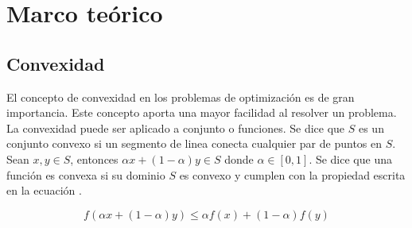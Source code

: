\section{Marco teórico}

\subsection{Convexidad}

El concepto de convexidad en los problemas de optimización es de gran importancia. Este concepto aporta una mayor facilidad al resolver un problema. La convexidad puede ser aplicado a conjunto o funciones. Se dice que $S$ es un conjunto convexo si un segmento de linea conecta cualquier par de puntos en $S$. Sean $x,y \in S$, entonces $\alpha x + (1-\alpha)y \in S$ donde $\alpha \in [0,1]$. Se dice que una función es convexa si su dominio $S$ es convexo y cumplen con la propiedad escrita en la ecuación .

\begin{equation}
    f(\alpha x + (1-\alpha)y) \leq \alpha f(x) + (1-\alpha)f(y)
\end{equation}